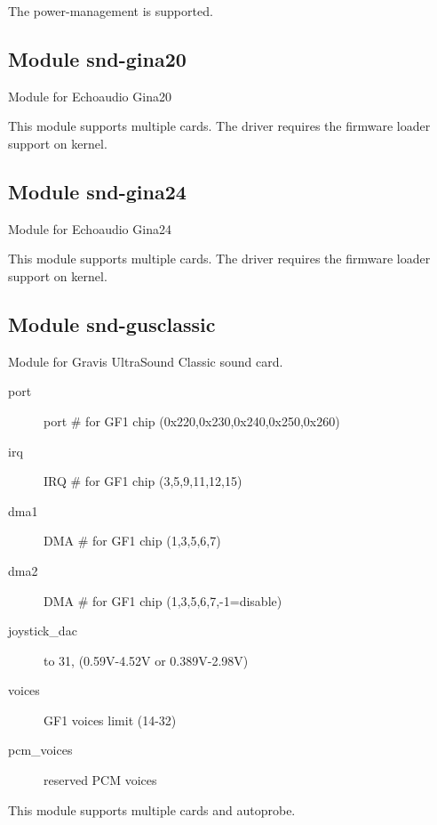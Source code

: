 \documentclass[a4paper,8pt,english]{sphinxmanual}
\begin{document}
The power-management is supported.


\subsection{Module snd-gina20}
\label{sound/alsa-configuration:module-snd-gina20}
Module for Echoaudio Gina20

This module supports multiple cards.
The driver requires the firmware loader support on kernel.


\subsection{Module snd-gina24}
\label{sound/alsa-configuration:module-snd-gina24}
Module for Echoaudio Gina24

This module supports multiple cards.
The driver requires the firmware loader support on kernel.


\subsection{Module snd-gusclassic}
\label{sound/alsa-configuration:module-snd-gusclassic}
Module for Gravis UltraSound Classic sound card.
\begin{description}
\item[{port}] \leavevmode
port \# for GF1 chip (0x220,0x230,0x240,0x250,0x260)

\item[{irq}] \leavevmode
IRQ \# for GF1 chip (3,5,9,11,12,15)

\item[{dma1}] \leavevmode
DMA \# for GF1 chip (1,3,5,6,7)

\item[{dma2}] \leavevmode
DMA \# for GF1 chip (1,3,5,6,7,-1=disable)

\item[{joystick\_dac}]  to 31, (0.59V-4.52V or 0.389V-2.98V)

\item[{voices}] \leavevmode
GF1 voices limit (14-32)

\item[{pcm\_voices}] \leavevmode
reserved PCM voices

\end{description}

This module supports multiple cards and autoprobe.
\end{document}
